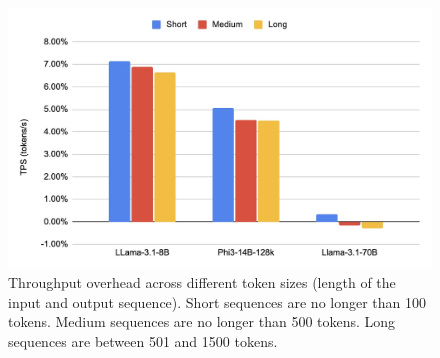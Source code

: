 \documentclass{article}
\begin{document}
\begin{figure}
    \centering
    \includegraphics[width=0.7\linewidth]{tps-vs-token-size.png}
    \caption{Throughput overhead across different token sizes (length of the input and output sequence). Short sequences are no longer than 100 tokens. Medium sequences are no longer than 500 tokens. Long sequences are between 501 and 1500 tokens.}
    \label{fig:tps-overhead-vs-token-size}
\end{figure}

\begin{table}[htbp]
\centering
{}
\caption{Performance comparison of TEE-on and TEE-off modes across different sequence lengths in terms of TPS (tokens per second). Short sequences are no longer than 100 tokens. Medium sequences are no longer than 500 tokens. Long sequences are between 501 and 1500 tokens.}
\label{tab:tps_short_medium_long}
\end{table}
\end{document}
